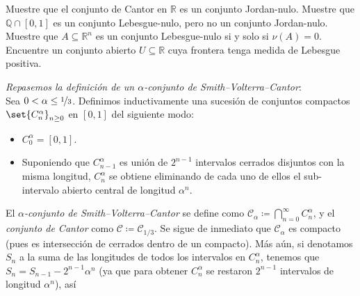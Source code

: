 \setcounter{neje}{24}
\begin{nejer}
Muestre que el conjunto de Cantor en $\mathbb{R}$ es un conjunto Jordan-nulo. Muestre que $\mathbb{Q} \cap[0,1]$ es un conjunto Lebesgue-nulo, pero no un conjunto Jordan-nulo. Muestre que $A \subseteq \mathbb{R}^n$ es un conjunto Lebesgue-nulo si y solo si $\nu(A) = 0$. Encuentre un conjunto abierto $U \subseteq \mathbb{R}$ cuya frontera tenga medida de Lebesgue positiva.
\end{nejer}
\begin{sol}
\emph{Repasemos la definición de un $\alpha$-conjunto de Smith--Volterra--Cantor}:\\
Sea $0 < \alpha \leq \nicefrac{1}{3}$. Definimos inductivamente una sucesión de
conjuntos compactos $\set{C^\alpha_n}_{n\ge 0}$ en $[0,1]$ del siguiente modo:
\begin{itemize}
\item $C^\alpha_0 = [0,1]$.
\item Suponiendo que $C^\alpha_{n-1}$ es unión de $2^{n-1}$ intervalos cerrados
disjuntos con la misma longitud, $C^\alpha_{n}$ se obtiene eliminando de cada uno de ellos el sub-intervalo abierto
central de longitud $\alpha^{n}$.
\end{itemize}
El \emph{$\alpha$-conjunto de Smith--Volterra--Cantor} se define como $\mathcal{C}_\alpha \coloneq \bigcap_{n=0}^{\infty} C^\alpha_n$, y el \emph{conjunto de Cantor} como $\mathcal{C} \coloneq \mathcal{C}_{1/3}$. Se sigue de inmediato que $\mathcal{C}_\alpha$ es compacto (pues es intersección de cerrados dentro de un compacto). Más aún, si denotamos $S_n$ a la suma de las longitudes de todos los intervalos en $C^\alpha_n$, tenemos que $S_{n}= S_{n-1} - 2^{n-1}\alpha^{n}$ (ya que para obtener $C^\alpha_{n}$ se restaron $2^{n-1}$ intervalos de longitud $\alpha^{n}$), así 

\end{sol}
